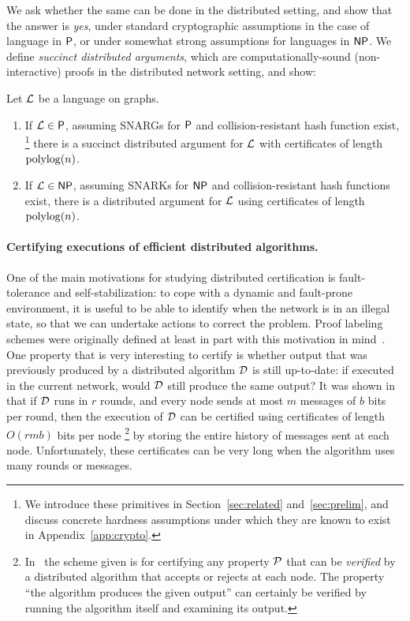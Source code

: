 We ask whether the same can be done in the distributed setting,	and show that the answer is \emph{yes}, under standard cryptographic assumptions in the case of language in ${\mathsf{P}}$, or under somewhat strong assumptions for languages in ${\mathsf{NP}}$. We define \emph{succinct distributed arguments}, which are computationally-sound (non-interactive) proofs in the distributed network setting, and show:
 \begin{theorem}\label{thm:centralized}
     Let $\mathcal{L}$ be a language on graphs.
     \begin{enumerate}
         \item If $\mathcal{L}\in{\mathsf{P}}$, assuming SNARGs for ${\mathsf{P}}$ and collision-resistant hash function exist,%
		\footnote{
         		We introduce these primitives in Section~\ref{sec:related} and~\ref{sec:prelim}, and discuss concrete hardness assumptions under which they are known to exist  in Appendix~\ref{app:crypto}.
         	}
		 there is a succinct distributed argument for $\mathcal{L}$ with certificates of length $\operatorname{polylog}(n)$.
         \item If $\mathcal{L}\in {\mathsf{NP}}$, assuming SNARKs for ${\mathsf{NP}}$ and %
         collision-resistant hash functions exist,
	 there is a distributed argument for $\mathcal{L}$ using certificates of length $\operatorname{polylog}(n)$.    
     \end{enumerate}
 \end{theorem}

 \paragraph{Certifying executions of efficient distributed algorithms.}
	One of the main motivations for studying distributed certification is fault-tolerance and self-stabilization:
	to cope with a dynamic and fault-prone environment, it is useful to be able to identify when 
	the network is  in an illegal state, so that we can undertake actions to correct the problem.
	Proof labeling schemes were originally defined at least in part with this motivation in mind~\cite{korman2005proof}.
	One property that is very interesting to certify is whether output that was
	previously produced by a distributed algorithm $\mathcal{D}$
	is still up-to-date: if executed in the current network, would $\mathcal{D}$ still produce the same output?
	It was shown in~\cite{korman2005proof} that if $\mathcal{D}$ runs in $r$ rounds, and every node sends at most $m$ messages
	of $b$ bits per round,
	then the execution of $\mathcal{D}$ can be certified using certificates of length $O(r m b)$ bits per node%
	\footnote{In~\cite{korman2005proof} the scheme given is for certifying any property $\mathcal{P}$ that can be \emph{verified}
	by a distributed algorithm that accepts or rejects at each node. The property ``the algorithm produces the given output'' can certainly be verified by running the algorithm itself and examining its output.}
	by storing the entire history of messages sent at each node.
	Unfortunately, these certificates can be very long when the algorithm uses many rounds or messages.

